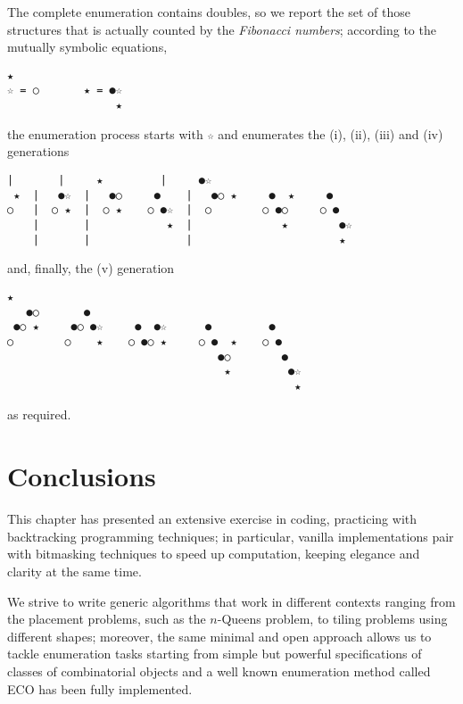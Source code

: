 \noindent The complete enumeration contains doubles, so we report the set of those
structures that is actually counted by the \textit{Fibonacci numbers};
according to the mutually symbolic equations,
\begin{Verbatim}[baselinestretch=0.5]
     ★
☆ = ○       ★ = ●☆
                 ★
\end{Verbatim}
the enumeration process starts with \verb|☆| and enumerates the (i), (ii),
(iii) and (iv) generations
\begin{Verbatim}[baselinestretch=0.5]
    |       |     ★         |     ●☆          
 ★  |   ●☆  |   ●○     ●    |   ●○ ★     ●  ★     ● 
○   |  ○ ★  |  ○ ★    ○ ●☆  |  ○        ○ ●○     ○ ●
    |       |            ★  |              ★        ●☆
    |       |               |                       ★
\end{Verbatim}
and, finally, the (v) generation
\begin{Verbatim}[baselinestretch=0.5]
     ★
   ●○       ●              
 ●○ ★     ●○ ●☆     ●  ●☆      ●         ●
○        ○    ★    ○ ●○ ★     ○ ●  ★    ○ ●
                                 ●○        ●
                                  ★         ●☆
                                             ★
\end{Verbatim}
as required.

\section*{Conclusions}

This chapter has presented an extensive exercise in coding, practicing with
backtracking programming techniques; in particular, vanilla implementations
pair with bitmasking techniques to speed up computation, keeping elegance and
clarity at the same time.

We strive to write generic algorithms that work in different contexts ranging
from the placement problems, such as the $n$-Queens problem, to tiling problems
using different shapes; moreover, the same minimal and open approach allows us
to tackle enumeration tasks starting from simple but powerful specifications of
classes of combinatorial objects and a well known enumeration method called ECO
has been fully implemented.
